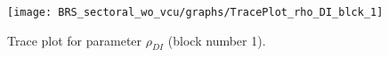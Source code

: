\begin{figure}[H]
\centering
  \texttt{[image: BRS\_sectoral\_wo\_vcu/graphs/TracePlot\_rho\_DI\_blck\_1]}\\
    \caption{Trace plot for parameter ${\rho_{DI}}$ (block number 1).}
\end{figure}
